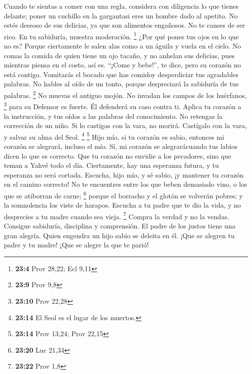  Cuando te sientas a comer con una regla, considera con
diligencia lo que tienes delante;  poner un cuchillo en la
gargantasi eres un hombre dado al apetito.  No estés
deseoso de sus delicias, ya que son alimentos engañosos. 
No te canses de ser rico. En tu sabiduría, muestra moderación.
\footnote{\textbf{23:4} Prov 28,22; Ecl 9,11}  ¿Por qué
pones tus ojos en lo que no es? Porque ciertamente le salen alas como a
un águila y vuela en el cielo.  No comas la comida de
quien tiene un ojo tacaño, y no anhelan sus delicias, 
pues mientras piensa en el costo, así es. ``¡Come y bebe!'', te dice,
pero su corazón no está contigo.  Vomitarás el bocado que
has comidoy desperdiciar tus agradables palabras.  No
hables al oído de un tonto, porque despreciará la sabiduría de tus
palabras. \footnote{\textbf{23:9} Prov 9,8}  No muevas el
antiguo mojón. No invadan los campos de los huérfanos, \footnote{\textbf{23:10}
  Prov 22,28}  para su Defensor es fuerte. Él defenderá
su caso contra ti.  Aplica tu corazón a la instrucción, y
tus oídos a las palabras del conocimiento.  No retengas
la corrección de un niño. Si lo castigas con la vara, no morirá.
 Castígalo con la vara, y salvar su alma del Seol.
\footnote{\textbf{23:14} El Seol es el lugar de los muertos.}
\footnote{\textbf{23:14} Prov 13,24; Prov 22,15}  Hijo
mío, si tu corazón es sabio, entonces mi corazón se alegrará, incluso el
mío.  Sí, mi corazón se alegrarácuando tus labios dicen
lo que es correcto.  Que tu corazón no envidie a los
pecadores, sino que teman a Yahvé todo el día. 
Ciertamente, hay una esperanza futura, y tu esperanza no será cortada.
 Escucha, hijo mío, y sé sabio, ¡y mantener tu corazón en
el camino correcto!  No te encuentres entre los que beben
demasiado vino, o los que se atiborran de carne; \footnote{\textbf{23:20}
  Luc 21,34}  porque el borracho y el glotón se volverán
pobres; y la somnolencia los viste de harapos.  Escucha a
tu padre que te dio la vida, y no desprecies a tu madre cuando sea
vieja. \footnote{\textbf{23:22} Prov 1,8}  Compra la
verdad y no la vendas. Consigue sabiduría, disciplina y comprensión.
 El padre de los justos tiene una gran alegría. Quien
engendra un hijo sabio se deleita en él.  ¡Que se alegren
tu padre y tu madre! ¡Que se alegre la que te parió! 
